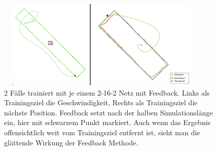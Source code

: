 \begin{figure}
	\centering
	\includegraphics[width=0.9\textwidth, height=160px]{pics/fb2.png}	
	\caption{2 Fälle trainiert mit je einem 2-16-2 Netz mit Feedback. Links als Trainingsziel die Geschwindigkeit, Rechts als Trainingsziel die nächste Position. Feedback setzt nach der halben Simulationslänge ein, hier mit schwarzem Punkt markiert. Auch wenn das Ergebnis offensichtlich weit vom Trainingsziel entfernt ist, sieht man die glättende Wirkung der Feedback Methode.}
	\label{img:fb2}
\end{figure}



